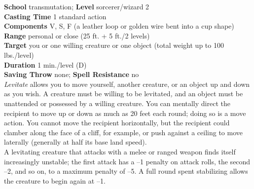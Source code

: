 \textbf{School} transmutation; \textbf{Level} sorcerer/wizard 2\\
\textbf{Casting Time} 1 standard action\\
\textbf{Components} V, S, F (a leather loop or golden wire bent into a cup shape)\\
\textbf{Range} personal or close (25 ft. + 5 ft./2 levels)\\
\textbf{Target} you or one willing creature or one object (total weight up to 100 lbs./level)\\
\textbf{Duration} 1 min./level (D)\\
\textbf{Saving Throw} none; \textbf{Spell Resistance} no\\
\textit{Levitate }allows you to move yourself, another creature, or an object up and down as you wish. A creature must be willing to be levitated\textit{, }and an object must be unattended or possessed by a willing creature. You can mentally direct the recipient to move up or down as much as 20 feet each round; doing so is a move action. You cannot move the recipient horizontally, but the recipient could clamber along the face of a cliff, for example, or push against a ceiling to move laterally (generally at half its base land speed).\\
A levitating creature that attacks with a melee or ranged weapon finds itself increasingly unstable; the first attack has a –1 penalty on attack rolls, the second –2, and so on, to a maximum penalty of –5. A full round spent stabilizing allows the creature to begin again at –1.\\
